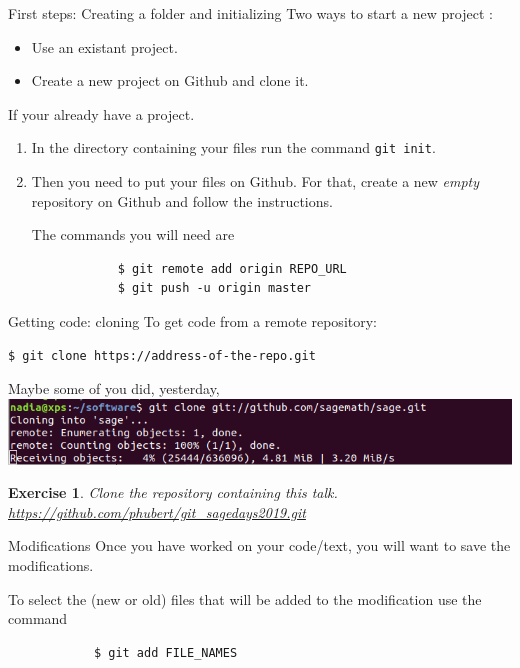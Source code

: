 \documentclass{beamer}
\newtheorem{exo}{Exercise}
\begin{document}
	\begin{frame}[fragile]{First steps: Creating a folder and initializing}
		Two ways to start a new project : 
		\begin{itemize}
			\item Use an existant project. 
			\item Create a new project on Github and clone it. \newline
		\end{itemize}
	
		If your already have a project.
		\begin{enumerate}
		\item  In the directory containing your files run the command 
		\texttt{git init}.
		
		\item  Then you need to put your files on Github. For that, create a new \emph{empty} repository on Github and follow the instructions.
		
		The commands you will need are 
		\begin{verbatim}
			$ git remote add origin REPO_URL
			$ git push -u origin master
		\end{verbatim}
		
		\end{enumerate}   
	\end{frame}

	\begin{frame}[fragile]{Getting code: cloning}
	To get code from a remote repository:
	\begin{verbatim}
$ git clone https://address-of-the-repo.git
	\end{verbatim}
	Maybe some of you did, yesterday,
	\includegraphics[width=\linewidth]{clone}
	\pause
	\begin{exo}
		Clone the repository containing this talk.
		\url{https://github.com/phubert/git_sagedays2019.git}
	\end{exo}
	\end{frame}

	\begin{frame}[fragile]{Modifications}
		Once you have worked on your code/text, you will want to save the modifications. \newline
		
		To select the (new or old) files that will be added to the modification use the command
		\begin{verbatim}
			$ git add FILE_NAMES
		\end{verbatim}
	\end{frame}
\end{document}
